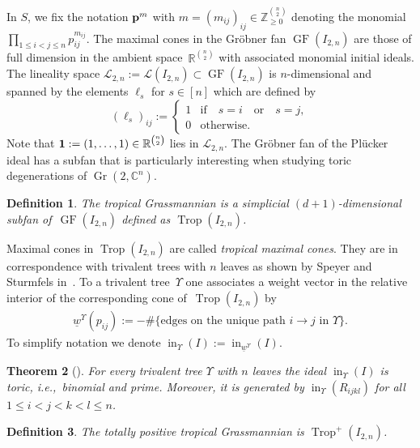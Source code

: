 \documentclass[10pt,a4paper]{amsart}
\newcommand{\thlabel}[1]{\label{#1}}
\newtheorem{Theorem}{Theorem}[section]
\newtheorem{Definition}[Theorem]{Definition}
\numberwithin{equation}{section}
\DeclareMathOperator{\init}{in}
\DeclareMathOperator{\Gr}{Gr}
\DeclareMathOperator{\GF}{GF}
\DeclareMathOperator{\trop}{Trop}
\begin{document}
In $S$, we fix the notation ${\bf p}^m$ with $m=(m_{ij})_{ij}\in \mathbb Z_{\ge 0}^{\binom{n}{2}}$ denoting the monomial $\prod_{1\le i<j\le n} p_{ij}^{m_{ij}}$.
The maximal cones in the Gr\"obner fan $\GF(I_{2,n})$ are those of full dimension in the ambient space~$\mathbb R^{\binom{n}{2}}$ with associated monomial initial ideals.
The lineality space $\mathcal L_{2,n}:=\mathcal L(I_{2,n})\subset \GF(I_{2,n})$ is $n$-dimensional and spanned by the elements $\ell_s$ for $s\in [n]$ which are defined by
\begin{displaymath}
(\ell_s)_{ij}:=\begin{cases}
1& \text{if}\quad s=i\quad \text{or}\quad s=j, \\ 0& \text{otherwise}.
\end{cases}
\end{displaymath}
Note that ${\bf 1}:=(1,\dots,1)\in \mathbb R^{\binom{n}{2}}$ lies in $\mathcal L_{2,n}$.
The Gr\"obner fan of the Pl\"ucker ideal has a subfan that is particularly interesting when studying toric degenerations of $\Gr(2,\mathbb C^n)$.

\begin{Definition}\thlabel{def:tropGr}
The {\it tropical Grassmannian} is a simplicial $(d+1)$-dimensional subfan of~$\GF(I_{2,n})$ defined as $\trop(I_{2,n})$.
\end{Definition}

Maximal cones in $\trop(I_{2,n})$ are called {\it tropical maximal cones}. They are in correspondence with trivalent trees with $n$ leaves as shown by Speyer and Sturmfels in~\cite{SS04}.
To a trivalent tree~$\Upsilon$ one associates a weight vector in the relative interior of the corresponding cone of~$\trop(I_{2,n})$ by %
\begin{gather}\label{eq:tree wt}
 \underline{w}^{\Upsilon}(p_{ij}):=-\#\{\text{edges on the unique path } i\to j \text{ in }\Upsilon\}.
\end{gather}
To simplify notation we denote $\init_{\Upsilon}(I):=\init_{\underline{w}^{\Upsilon}}(I)$.

\begin{Theorem}[\cite{SS04}]\thlabel{thm:SS}
For every trivalent tree $\Upsilon$ with $n$ leaves the ideal $\init_{{\Upsilon}}(I)$ is {\it toric}, i.e.,~bino\-mial and prime.
Moreover, it is generated by $\init_{{\Upsilon}}(R_{ijkl})$ for all $1\le i<j<k<l\le n$.
\end{Theorem}


\begin{Definition}\thlabel{def:trop+Gr}
The {\it totally positive tropical} Grassmannian is $\trop^+(I_{2,n})$.
\end{Definition}
\end{document}
